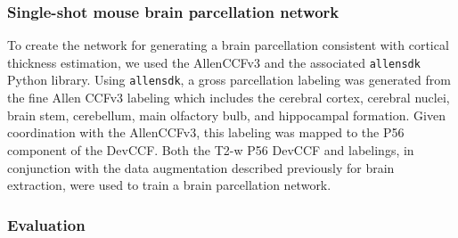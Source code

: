 \documentclass[
  12pt,
]{article}
\begin{document}
\subsubsection{Single-shot mouse brain parcellation
network}\label{single-shot-mouse-brain-parcellation-network}

To create the network for generating a brain parcellation consistent
with cortical thickness estimation, we used the AllenCCFv3 and the
associated \texttt{allensdk} Python library. Using \texttt{allensdk}, a
gross parcellation labeling was generated from the fine Allen CCFv3
labeling which includes the cerebral cortex, cerebral nuclei, brain
stem, cerebellum, main olfactory bulb, and hippocampal formation. Given
coordination with the AllenCCFv3, this labeling was mapped to the P56
component of the DevCCF. Both the T2-w P56 DevCCF and labelings, in
conjunction with the data augmentation described previously for brain
extraction, were used to train a brain parcellation network.

\subsubsection{Evaluation}\label{evaluation}
\end{document}
